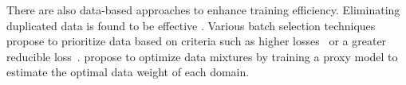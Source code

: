 There are also data-based approaches to enhance training efficiency.
Eliminating duplicated data is found to be effective
\citep{lee2021deduplicating}. 
Various batch selection techniques propose to prioritize data based on criteria such as 
higher losses~\citep{jiang2019accelerating} or a greater reducible loss~\citep{mindermann2022prioritized}. 
\cite{xie2023doremi}
propose to 
optimize data mixtures 
by training a proxy model to estimate the optimal data weight of each domain. 






